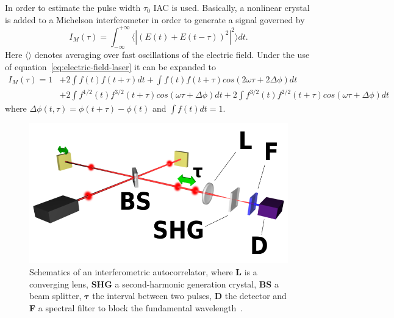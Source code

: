 In order to estimate the pulse width $\tau_0$ \ac{IAC} is used.
Basically, a nonlinear crystal is added to a Michelson interferometer in order to generate a signal governed by~\cite{diels_ultrashort_2006}
\begin{equation}
\label{eq:i-m-integral}
I_M(\tau) = \int_{-\infty}^{+\infty}\langle|(E(t)+E(t-\tau))^2|^2\rangle dt.
\end{equation}
Here $\langle \rangle$ denotes averaging over fast oscillations of the electric field.
Under the use of equation~\ref{eq:electric-field-laser} it can be expanded to
\begin{align}
I_M(\tau) = 1 &+ 2 \int f(t) f(t + \tau) dt + \int f(t) f(t + \tau) cos(2 \omega \tau + 2 \Delta \phi) dt \nonumber\\
&+ 2 \int f^{1/2}(t) f^{3/2}(t + \tau) cos(\omega \tau + \Delta \phi) dt + 2 \int f^{3/2}(t) f^{2/2}(t + \tau) cos(\omega \tau + \Delta \phi) dt
\end{align}
where $\Delta \phi(t, \tau) = \phi(t + \tau) - \phi(t)$ and $\int f(t) dt = 1$.
\begin{figure}[H]
	\centering
	\includegraphics[width=0.6\linewidth]{figures/chirp/Optical-interferometric-autocorrelation-setup.png}
	\caption[Schematics of an interferometric autocorrelator]{Schematics of an interferometric autocorrelator, where \textbf{L} is a converging lens, \textbf{SHG} a second-harmonic generation crystal, \textbf{BS} a beam splitter, $\mathbf{\tau}$ the interval between two pulses, \textbf{D} the detector and \textbf{F} a spectral filter to block the fundamental wavelength~\cite{noauthor_optical_nodate}.}
	\label{fig:optical-field-autocorrelation-setup}
\end{figure}

